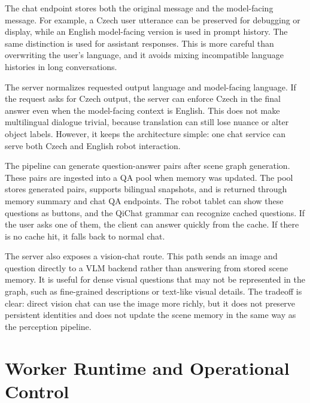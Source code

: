 The chat endpoint stores both the original message and the model-facing message. For example, a Czech user utterance can be preserved for debugging or display, while an English model-facing version is used in prompt history. The same distinction is used for assistant responses. This is more careful than overwriting the user's language, and it avoids mixing incompatible language histories in long conversations.

The server normalizes requested output language and model-facing language. If the request asks for Czech output, the server can enforce Czech in the final answer even when the model-facing context is English. This does not make multilingual dialogue trivial, because translation can still lose nuance or alter object labels. However, it keeps the architecture simple: one chat service can serve both Czech and English robot interaction.

The pipeline can generate question-answer pairs after scene graph generation. These pairs are ingested into a QA pool when memory was updated. The pool stores generated pairs, supports bilingual snapshots, and is returned through memory summary and chat QA endpoints. The robot tablet can show these questions as buttons, and the QiChat grammar can recognize cached questions. If the user asks one of them, the client can answer quickly from the cache. If there is no cache hit, it falls back to normal chat.

The server also exposes a vision-chat route. This path sends an image and question directly to a VLM backend rather than answering from stored scene memory. It is useful for dense visual questions that may not be represented in the graph, such as fine-grained descriptions or text-like visual details. The tradeoff is clear: direct vision chat can use the image more richly, but it does not preserve persistent identities and does not update the scene memory in the same way as the perception pipeline.

\section{Worker Runtime and Operational Control}\label{sec:server-worker-runtime}

